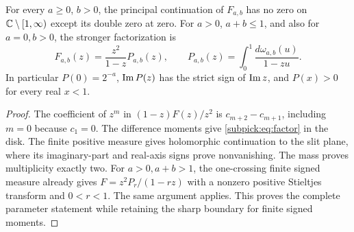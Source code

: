 \begin{theorem}
\label{subpick:thm:global}
For every $a\ge0$, $b>0$, the principal continuation of $F_{a,b}$
has no zero on $\mathbb C\setminus[1,\infty)$ except its double zero at zero.
For $a>0$, $a+b\le1$, and also for $a=0,b>0$, the stronger factorization is
\begin{equation}\label{subpick:eq:factor}
 F_{a,b}(z)=\frac{z^2}{1-z}P_{a,b}(z),\qquad
 P_{a,b}(z)=\int_0^1\frac{d\omega_{a,b}(u)}{1-zu}.
\end{equation}
In particular $P(0)=2^{-a}$, $\operatorname{Im} P(z)$ has the strict sign of
$\operatorname{Im} z$, and $P(x)>0$ for every real $x<1$.
\end{theorem}
\begin{proof}
The coefficient of $z^m$ in $(1-z)F(z)/z^2$ is
$c_{m+2}-c_{m+1}$, including $m=0$ because $c_1=0$.
The difference moments give \eqref{subpick:eq:factor} in the disk.
The finite positive measure gives holomorphic continuation to the slit
plane, where its imaginary-part and real-axis signs prove nonvanishing.
The mass proves multiplicity exactly two. For $a>0,a+b>1$, the
one-crossing finite signed measure already gives
$F=z^2P_r/(1-rz)$ with a nonzero positive Stieltjes transform and
$0<r<1$. The same argument applies. This proves the complete parameter
statement while retaining the sharp boundary for finite signed moments.
\end{proof}

